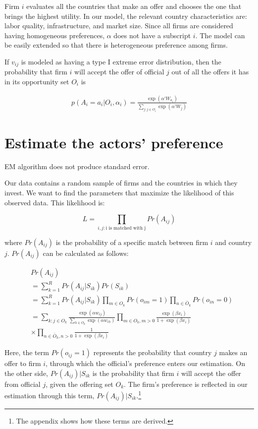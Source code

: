 \documentclass[12pt]{article}
\begin{document}
Firm $i$ evaluates all the countries that make an offer and chooses the one that brings the highest utility. In our model, the relevant country characteristics are: labor quality, infrastructure, and market size. Since all firms are considered having homogeneous preferences, $\alpha$ does not have a subscript $i$. The model can be easily extended so that there is heterogeneous preference among firms.

If $v_{ij}$ is modeled as having a type I extreme error distribution, then the probability that firm $i$ will accept the offer of official $j$ out of all the offers it has in its opportunity set $O_i$ is

\begin{align}
p(A_i = a_i | O_i, \alpha_i) = \frac{\exp(\alpha'W_{a_i})}{\sum\limits_{j:j \in O_i} \exp(\alpha'W_j)} \label{eq:conditional_probability_of_accept}
\end{align}

\section{Estimate the actors' preference}
\label{sec:tsl_estimate}

EM algorithm does not produce standard error.

Our data contains a random sample of firms and the countries in which they invest. We want to find the parameters that maximize the likelihood of this observed data. This likelihood is:

\[
L = \prod_{i,j: \text{i is matched with j}} Pr(A_{ij})
\]

where $Pr(A_{ij})$ is the probability of a specific match between firm $i$ and country $j$. $Pr(A_{ij})$ can be calculated as follows:

\begin{align}
&Pr(A_{ij}) \\
&= \sum_{k=1}^R Pr(A_{ij}|S_{ik}) Pr(S_{ik}) \\
&= \sum_{k=1}^R Pr(A_{ij} | S_{ik}) \prod_{m \in O_k} Pr(o_{im} = 1) \prod_{n \in \bar O_k} Pr(o_{in} = 0) \\
&= \sum_{k:j \in O_k} \frac{\exp(\alpha w_{ij})}{\displaystyle\sum_{h \in O_k} \exp(\alpha w_{ih})} \prod_{m \in O_k, m > 0} \frac{\exp(\beta x_{i})}{1 + \exp(\beta x_i)} \\
&\times \prod_{n \in \bar O_k, n > 0} \frac{1}{1 + \exp(\beta x_i)}
\end{align}

Here, the term $Pr(o_{ij} = 1)$ represents the probability that country $j$ makes an offer to firm $i$, through which the official's preference enters our estimation. On the other side, $Pr(A_{ij}) | S_{ik}$ is the probability that firm $i$ will accept the offer from official $j$, given the offering set $O_k$. The firm's preference is reflected in our estimation through this term, $Pr(A_{ij})|S_{ik}$.\footnote{The appendix shows how these terms are derived.}
\end{document}

